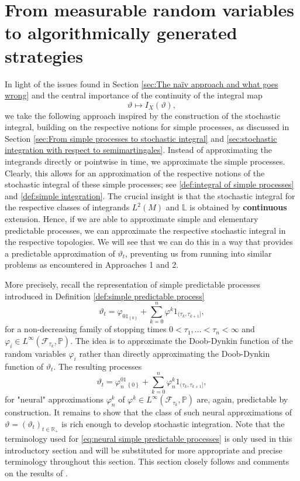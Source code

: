 \documentclass[11pt,a4paper,twoside,openany]{report}
\numberwithin{equation}{section}
\theoremstyle{plain} %
\theoremstyle{definition} %
\theoremstyle{remark} %
\let\parencite\authnumparencite
\begin{document}
\section{From measurable random variables to algorithmically generated strategies}\label{sec:main ideas of alexandar}
 In light of the issues found in Section \ref{sec:The naïv approach and what goes wrong} and the central importance of the continuity of the integral map 
 \begin{equation*}
     \vartheta\mapsto I_X(\vartheta),
 \end{equation*}
 we take the following approach inspired by the construction of the stochastic integral, building on the respective notions for simple processes, as discussed in Section \ref{sec:From simple processes to stochastic integral} and \ref{sec:stochastic integration with respect to semimartingales}. Instead of approximating the integrands directly or pointwise in time, we approximate the simple processes. Clearly, this allows for an approximation of the respective notions of the stochastic integral of these simple processes; see \ref{def:integral of simple processes} and \eqref{def:simple integration}. The crucial insight is that the stochastic integral for the respective classes of integrands \(L^2(M)\) and \(\mathbb{L}\) is obtained by \textbf{continuous} extension. Hence, if we are able to approximate simple and elementary predictable processes, we can approximate the respective stochastic integral in the respective topologies. We will see that we can do this in a way that provides a predictable approximation of \(\vartheta_t\), preventing us from running into similar problems as encountered in Approaches 1 and 2.

 
More precisely, recall the representation of simple predictable processes introduced in Definition \ref{def:simple predictable process}
 \begin{equation*}
     \vartheta_t = \varphi_01_{\left\{ 0\right\}}+\sum_{k=0}^n \varphi^k1_{(\tau_k,\tau_{k+1}]},
 \end{equation*}
 for a non-decreasing family of stopping times \(0<\tau_1,\dots<\tau_n<\infty\) and \(\varphi_i\in L^{\infty}(\mathcal{F}_{\tau_k},\mathbb{P})\). The idea is to approximate the Doob-Dynkin function of the random variables \(\varphi_i\) rather than directly approximating the Doob-Dynkin function of \(\vartheta_t\). The resulting processes
 \begin{equation}\label{eq:neural simple predictable processes}
     \vartheta_t = \varphi_n^01_{\left\{ 0\right\}}+\sum_{k=0}^n \varphi_n^k1_{(\tau_k,\tau_{k+1}]},
 \end{equation}
 for "neural" approximations \(\varphi_n^k\) of \(\varphi^k\in L^{\infty}(\mathcal{F}_{\tau_k},\mathbb{P})\) are, again, predictable by construction. It remains to show that the class of such neural approximations of \(\vartheta=(\vartheta_t)_{t\in\mathbb{R}_+}\) is rich enough to develop stochastic integration.
 Note that the terminology used for \eqref{eq:neural simple predictable processes} is only used in this introductory section and will be substituted for more appropriate and precise terminology throughout this section. This section closely follows and comments on the results of \parencite[Chapter.~5]{Arandjelovic2025}.
\end{document}
